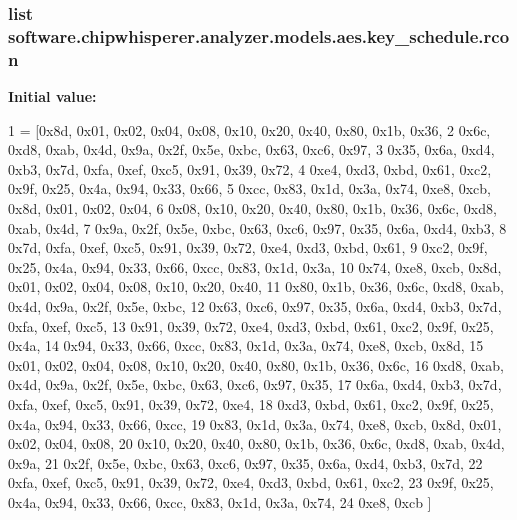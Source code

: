 \subsubsection[{rcon}]{\setlength{\rightskip}{0pt plus 5cm}list software.\+chipwhisperer.\+analyzer.\+models.\+aes.\+key\+\_\+schedule.\+rcon}\label{namespacesoftware_1_1chipwhisperer_1_1analyzer_1_1models_1_1aes_1_1key__schedule_acf2e930c08018b7cb8ecc9d19ccb48d1}
{\bfseries Initial value\+:}
\begin{DoxyCode}
1 = [0x8d, 0x01, 0x02, 0x04, 0x08, 0x10, 0x20, 0x40, 0x80, 0x1b, 0x36,
2             0x6c, 0xd8, 0xab, 0x4d, 0x9a, 0x2f, 0x5e, 0xbc, 0x63, 0xc6, 0x97,
3             0x35, 0x6a, 0xd4, 0xb3, 0x7d, 0xfa, 0xef, 0xc5, 0x91, 0x39, 0x72,
4             0xe4, 0xd3, 0xbd, 0x61, 0xc2, 0x9f, 0x25, 0x4a, 0x94, 0x33, 0x66,
5             0xcc, 0x83, 0x1d, 0x3a, 0x74, 0xe8, 0xcb, 0x8d, 0x01, 0x02, 0x04,
6             0x08, 0x10, 0x20, 0x40, 0x80, 0x1b, 0x36, 0x6c, 0xd8, 0xab, 0x4d,
7             0x9a, 0x2f, 0x5e, 0xbc, 0x63, 0xc6, 0x97, 0x35, 0x6a, 0xd4, 0xb3,
8             0x7d, 0xfa, 0xef, 0xc5, 0x91, 0x39, 0x72, 0xe4, 0xd3, 0xbd, 0x61,
9             0xc2, 0x9f, 0x25, 0x4a, 0x94, 0x33, 0x66, 0xcc, 0x83, 0x1d, 0x3a,
10             0x74, 0xe8, 0xcb, 0x8d, 0x01, 0x02, 0x04, 0x08, 0x10, 0x20, 0x40,
11             0x80, 0x1b, 0x36, 0x6c, 0xd8, 0xab, 0x4d, 0x9a, 0x2f, 0x5e, 0xbc,
12             0x63, 0xc6, 0x97, 0x35, 0x6a, 0xd4, 0xb3, 0x7d, 0xfa, 0xef, 0xc5,
13             0x91, 0x39, 0x72, 0xe4, 0xd3, 0xbd, 0x61, 0xc2, 0x9f, 0x25, 0x4a,
14             0x94, 0x33, 0x66, 0xcc, 0x83, 0x1d, 0x3a, 0x74, 0xe8, 0xcb, 0x8d,
15             0x01, 0x02, 0x04, 0x08, 0x10, 0x20, 0x40, 0x80, 0x1b, 0x36, 0x6c,
16             0xd8, 0xab, 0x4d, 0x9a, 0x2f, 0x5e, 0xbc, 0x63, 0xc6, 0x97, 0x35,
17             0x6a, 0xd4, 0xb3, 0x7d, 0xfa, 0xef, 0xc5, 0x91, 0x39, 0x72, 0xe4,
18             0xd3, 0xbd, 0x61, 0xc2, 0x9f, 0x25, 0x4a, 0x94, 0x33, 0x66, 0xcc,
19             0x83, 0x1d, 0x3a, 0x74, 0xe8, 0xcb, 0x8d, 0x01, 0x02, 0x04, 0x08,
20             0x10, 0x20, 0x40, 0x80, 0x1b, 0x36, 0x6c, 0xd8, 0xab, 0x4d, 0x9a,
21             0x2f, 0x5e, 0xbc, 0x63, 0xc6, 0x97, 0x35, 0x6a, 0xd4, 0xb3, 0x7d,
22             0xfa, 0xef, 0xc5, 0x91, 0x39, 0x72, 0xe4, 0xd3, 0xbd, 0x61, 0xc2,
23             0x9f, 0x25, 0x4a, 0x94, 0x33, 0x66, 0xcc, 0x83, 0x1d, 0x3a, 0x74,
24             0xe8, 0xcb ]
\end{DoxyCode}
